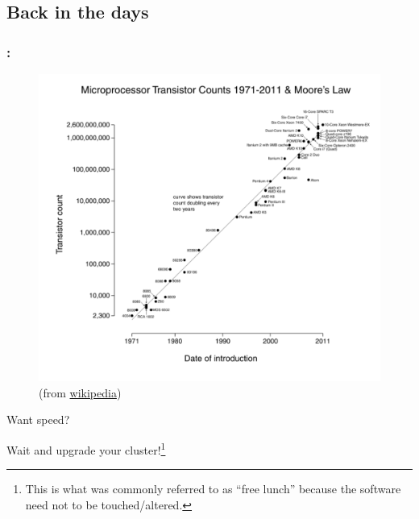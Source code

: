 \documentclass[9pt,xcolor=table]{beamer}
\begin{document}
\subsection{Back in the days}
\begin{frame}
\frametitle{\insertsectionhead{}: \insertsubsectionhead{}}
\begin{figure}[htb]
  \includegraphics[height=0.65\textheight]{img/wikipedia_mooreslaw_2011}\\[2pt]\small
  (from \href{http://en.wikipedia.org/wiki/Moore\%27s_law}{wikipedia})
  \end{figure}
  \begin{block}{Want speed?}
    \begin{center}\Large
      Wait and upgrade your cluster!\footnote{This is what was commonly referred to as ``free lunch'' because the software need not to be touched/altered.}
    \end{center}
  \end{block}
\end{frame}
\end{document}
